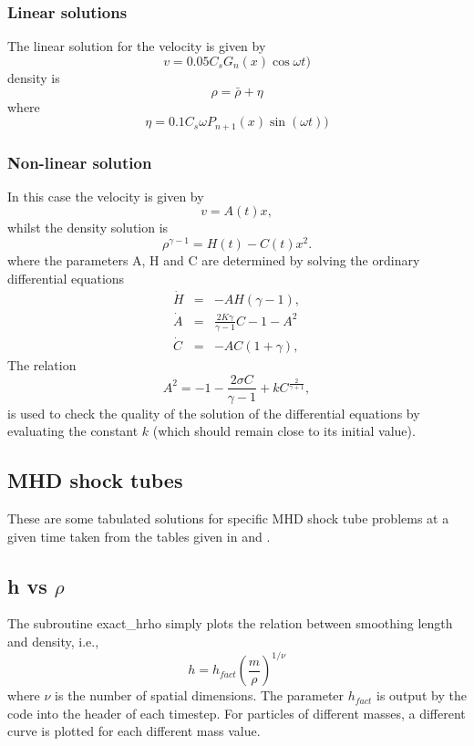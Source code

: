 \documentclass[a4paper,10pt]{article}
\begin{document}
\subsubsection{ Linear solutions}
The linear solution for the velocity is given by
\begin{equation}
v = 0.05 C_s G_n(x) \cos{\omega t} )
\end{equation}
density is
\begin{equation}
\rho = \bar{\rho} + \eta
\end{equation}
where 
\begin{equation}
\eta = 0.1 C_s \omega P_{n+1}(x) \sin{(\omega t)})
\end{equation}

\subsubsection{ Non-linear solution}
In this case the velocity is given by
\begin{equation}
v = A(t) x,
\end{equation}
whilst the density solution is
\begin{equation}
\rho^{\gamma -1} = H(t) - C(t) x^2.
\end{equation}
where the parameters A, H and C are determined by solving the ordinary
differential equations
\begin{eqnarray}
\dot{H} & = & -AH(\gamma -1), \\
\dot{A} & = & \frac{2K \gamma}{\gamma -1} C - 1 - A^2 \\
\dot{C} & = & -AC(1+ \gamma),
\end{eqnarray}
The relation
\begin{equation}
A^2 = -1 - \frac{2 \sigma C}{\gamma -1} + kC^{\frac{2}{\gamma +1}},
\label{eq:kconst}
\end{equation}
is used to check the quality of the solution of the differential equations by
evaluating the constant $k$ (which should remain close to its initial value).

\subsection{MHD shock tubes}
 These are some tabulated solutions for specific MHD shock tube problems at a
given time taken from the tables given in \citet{dw94} and \citet{rj95}.

\subsection{h vs $\rho$}
 The subroutine exact\_hrho simply plots the relation between smoothing length
and density, i.e.,
\begin{equation}
h = h_{fact} \left(\frac{m}{\rho}\right)^{1/\nu}
\end{equation}
where $\nu$ is the number of spatial dimensions. The parameter $h_{fact}$ is
output by the code into the header of each timestep. For particles of different
masses, a different curve is plotted for each different mass value.
\end{document}
